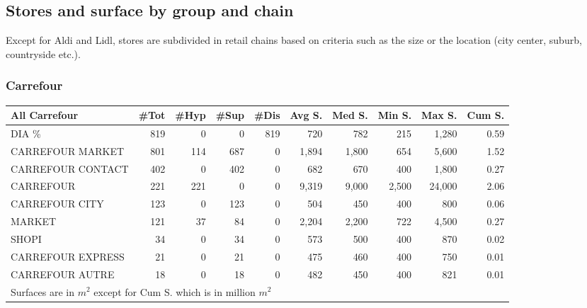 \documentclass[11pt]{article}
\begin{document}
\subsection{Stores and surface by group and chain}

Except for Aldi and Lidl, stores are subdivided in retail chains based on criteria such as the size or the location (city center, suburb, countryside etc.).

\subsubsection{Carrefour}

\begin{table}[H]
\footnotesize
\setlength{\tabcolsep}{2pt}

\begin{tabular}{lrrrrrrrrr}
\toprule
\toprule
All Carrefour &       \#Tot &       \#Hyp &       \#Sup &       \#Dis &     Avg S. &     Med S. &     Min S. &     Max S. &     Cum S. \\
\midrule
DIA \%             &        819 &          0 &          0 &        819 &        720 &        782 &        215 &      1,280 &       0.59 \\
CARREFOUR MARKET  &        801 &        114 &        687 &          0 &      1,894 &      1,800 &        654 &      5,600 &       1.52 \\
CARREFOUR CONTACT &        402 &          0 &        402 &          0 &        682 &        670 &        400 &      1,800 &       0.27 \\
CARREFOUR         &        221 &        221 &          0 &          0 &      9,319 &      9,000 &      2,500 &     24,000 &       2.06 \\
CARREFOUR CITY    &        123 &          0 &        123 &          0 &        504 &        450 &        400 &        800 &       0.06 \\
MARKET            &        121 &         37 &         84 &          0 &      2,204 &      2,200 &        722 &      4,500 &       0.27 \\
SHOPI             &         34 &          0 &         34 &          0 &        573 &        500 &        400 &        870 &       0.02 \\
CARREFOUR EXPRESS &         21 &          0 &         21 &          0 &        475 &        460 &        400 &        750 &       0.01 \\
CARREFOUR AUTRE   &         18 &          0 &         18 &          0 &        482 &        450 &        400 &        821 &       0.01 \\
\bottomrule
\multicolumn{10}{l}{\footnotesize Surfaces are in $m^2$ except for Cum S. which is in million $m^2$} \\
\end{tabular}

\end{table}
\end{document}
